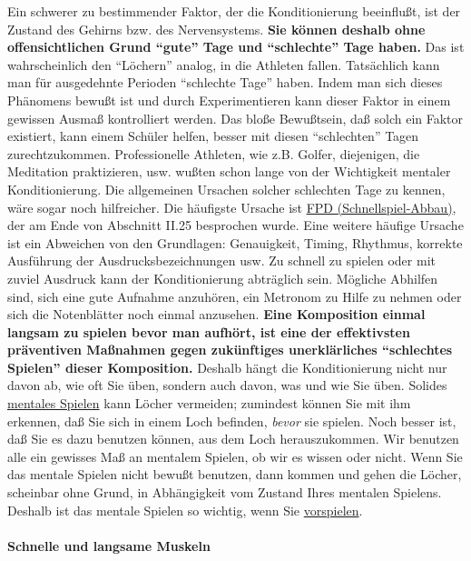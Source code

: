 Ein schwerer zu bestimmender Faktor, der die Konditionierung beeinflußt, ist der Zustand des Gehirns bzw. des Nervensystems.
\textbf{Sie können deshalb ohne offensichtlichen Grund \enquote{gute} Tage und \enquote{schlechte} Tage haben.}
Das ist wahrscheinlich den \enquote{Löchern} analog, in die Athleten fallen.
Tatsächlich kann man für ausgedehnte Perioden \enquote{schlechte Tage} haben.
Indem man sich dieses Phänomens bewußt ist und durch Experimentieren kann dieser Faktor in einem gewissen Ausmaß kontrolliert werden.
Das bloße Bewußtsein, daß solch ein Faktor existiert, kann einem Schüler helfen, besser mit diesen \enquote{schlechten} Tagen zurechtzukommen.
Professionelle Athleten, wie z.B. Golfer, diejenigen, die Meditation praktizieren, usw. wußten schon lange von der Wichtigkeit mentaler Konditionierung.
Die allgemeinen Ursachen solcher schlechten Tage zu kennen, wäre sogar noch hilfreicher.
Die häufigste Ursache ist \hyperref[fpd]{FPD (Schnellspiel-Abbau)}, der am Ende von Abschnitt II.25 besprochen wurde.
Eine weitere häufige Ursache ist ein Abweichen von den Grundlagen: Genauigkeit, Timing, Rhythmus, korrekte Ausführung der Ausdrucksbezeichnungen usw.
Zu schnell zu spielen oder mit zuviel Ausdruck kann der Konditionierung abträglich sein.
Mögliche Abhilfen sind, sich eine gute Aufnahme anzuhören, ein Metronom zu Hilfe zu nehmen oder sich die Notenblätter noch einmal anzusehen.
\textbf{Eine Komposition einmal langsam zu spielen bevor man aufhört, ist eine der effektivsten präventiven Maßnahmen gegen zukünftiges unerklärliches \enquote{schlechtes Spielen} dieser Komposition.}
Deshalb hängt die Konditionierung nicht nur davon ab, wie oft Sie üben, sondern auch davon, was und wie Sie üben.
Solides \hyperref[c1ii12]{mentales Spielen} kann Löcher vermeiden; zumindest können Sie mit ihm erkennen, daß Sie sich in einem Loch befinden, \textit{bevor} sie spielen.
Noch besser ist, daß Sie es dazu benutzen können, aus dem Loch herauszukommen.
Wir benutzen alle ein gewisses Maß an mentalem Spielen, ob wir es wissen oder nicht.
Wenn Sie das mentale Spielen nicht bewußt benutzen, dann kommen und gehen die Löcher, scheinbar ohne Grund, in Abhängigkeit vom Zustand Ihres mentalen Spielens.
Deshalb ist das mentale Spielen so wichtig, wenn Sie \hyperref[c1iii14]{vorspielen}.


\paragraph{Schnelle und langsame Muskeln}
\label{c1iii7aMuskeln}

